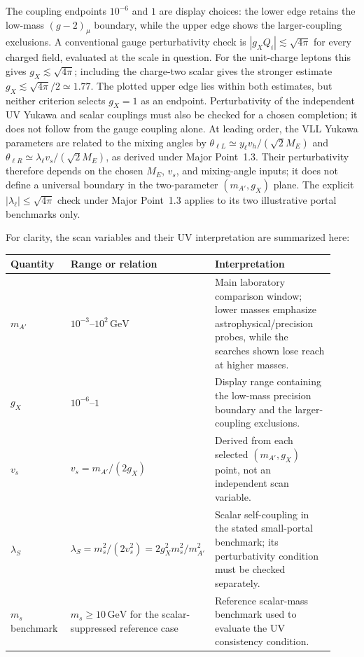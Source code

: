 \documentclass[12pt,a4paper]{article}
\begin{document}
The coupling endpoints \(10^{-6}\) and \(1\) are display choices: the lower edge retains the low-mass \((g-2)_\mu\) boundary, while the upper edge shows the larger-coupling exclusions. A conventional gauge perturbativity check is \(|g_X Q_i|\lesssim\sqrt{4\pi}\) for every charged field, evaluated at the scale in question. For the unit-charge leptons this gives \(g_X\lesssim\sqrt{4\pi}\); including the charge-two scalar gives the stronger estimate \(g_X\lesssim\sqrt{4\pi}/2\simeq1.77\). The plotted upper edge lies within both estimates, but neither criterion selects \(g_X=1\) as an endpoint. Perturbativity of the independent UV Yukawa and scalar couplings must also be checked for a chosen completion; it does not follow from the gauge coupling alone. At leading order, the VLL Yukawa parameters are related to the mixing angles by \(\theta_{\ell L}\simeq y_\ell v_h/(\sqrt2M_E)\) and \(\theta_{\ell R}\simeq\lambda_\ell v_s/(\sqrt2M_E)\), as derived under Major Point~1.3. Their perturbativity therefore depends on the chosen \(M_E\), \(v_s\), and mixing-angle inputs; it does not define a universal boundary in the two-parameter \((m_{A'},g_X)\) plane. The explicit \(|\lambda_\ell|\leq\sqrt{4\pi}\) check under Major Point~1.3 applies to its two illustrative portal benchmarks only.

For clarity, the scan variables and their UV interpretation are summarized here:
\begin{center}
\small
\begin{tabular}{@{}P{0.19\linewidth}P{0.34\linewidth}P{0.39\linewidth}@{}}
\hline
Quantity & Range or relation & Interpretation\\
\hline
\(m_{A'}\) & \(10^{-3}\)--\(10^2\,\mathrm{GeV}\) & Main laboratory comparison window; lower masses emphasize astrophysical/precision probes, while the searches shown lose reach at higher masses.\\
\(g_X\) & \(10^{-6}\)--\(1\) & Display range containing the low-mass precision boundary and the larger-coupling exclusions.\\
\(v_s\) & \(v_s=m_{A'}/(2g_X)\) & Derived from each selected \((m_{A'},g_X)\) point, not an independent scan variable.\\
\(\lambda_S\) & \(\lambda_S=m_s^2/(2v_s^2)=2g_X^2m_s^2/m_{A'}^2\) & Scalar self-coupling in the stated small-portal benchmark; its perturbativity condition must be checked separately.\\
\(m_s\) benchmark & \(m_s\geq10\,\mathrm{GeV}\) for the scalar-suppressed reference case & Reference scalar-mass benchmark used to evaluate the UV consistency condition.\\
\hline
\end{tabular}
\end{center}
\end{document}
